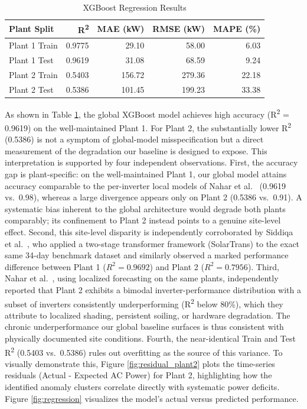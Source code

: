 \documentclass[11pt,a4paper,twoside]{article}
\begin{document}
\begin{table}[H]
\caption{XGBoost Regression Results}
\begin{center}
\begin{tabular}{lrrrr}
\toprule
\textbf{Plant Split} & \textbf{R\textsuperscript{2}} & \textbf{MAE (kW)} & \textbf{RMSE (kW)} & \textbf{MAPE (\%)} \\
\midrule
Plant 1 Train & 0.9775 & 29.10 & 58.00 & 6.03 \\
Plant 1 Test & 0.9619 & 31.08 & 68.59 & 9.24 \\
Plant 2 Train & 0.5403 & 156.72 & 279.36 & 22.18 \\
Plant 2 Test & 0.5386 & 101.45 & 199.23 & 33.38 \\
\bottomrule
\end{tabular}
\label{tab:xgb_results}
\end{center}
\end{table}

As shown in Table \ref{tab:xgb_results}, the global XGBoost model achieves high accuracy (R\textsuperscript{2} = 0.9619) on the well-maintained Plant 1. For Plant 2, the substantially lower R\textsuperscript{2} (0.5386) is not a symptom of global-model misspecification but a direct measurement of the degradation our baseline is designed to expose. This interpretation is supported by four independent observations. First, the accuracy gap is plant-specific: on the well-maintained Plant 1, our global model attains accuracy comparable to the per-inverter local models of Nahar et al.~\cite{nahar2025} (0.9619 vs.\ 0.98), whereas a large divergence appears only on Plant 2 (0.5386 vs.\ 0.91). A systematic bias inherent to the global architecture would degrade both plants comparably; its confinement to Plant 2 instead points to a genuine site-level effect. Second, this site-level disparity is independently corroborated by Siddiqa et al.~\cite{siddiqa2025}, who applied a two-stage transformer framework (SolarTrans) to the exact same 34-day benchmark dataset and similarly observed a marked performance difference between Plant 1 ($R^2 = 0.9692$) and Plant 2 ($R^2 = 0.7956$). Third, Nahar et al.~\cite{nahar2025}, using localized forecasting on the same plants, independently reported that Plant 2 exhibits a bimodal inverter-performance distribution with a subset of inverters consistently underperforming (R\textsuperscript{2} below 80\%), which they attribute to localized shading, persistent soiling, or hardware degradation. The chronic underperformance our global baseline surfaces is thus consistent with physically documented site conditions. Fourth, the near-identical Train and Test R\textsuperscript{2} (0.5403 vs.\ 0.5386) rules out overfitting as the source of this variance. To visually demonstrate this, Figure \ref{fig:residual_plant2} plots the time-series residuals (Actual - Expected AC Power) for Plant 2, highlighting how the identified anomaly clusters correlate directly with systematic power deficits. Figure \ref{fig:regression} visualizes the model's actual versus predicted performance.
\end{document}
